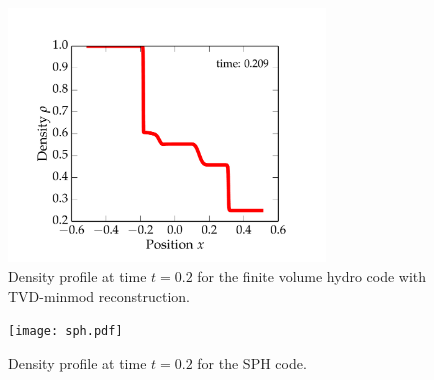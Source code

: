 \documentclass{article}
\begin{document}
\begin{spacing}{1.1}
\begin{figure}[H]
 \centering
 \hspace{0cm} \includegraphics[width=0.75\textwidth]{minmod.pdf}
 \caption{Density profile at time \(t = 0.2\) for the finite volume hydro code with TVD-minmod reconstruction.}
\end{figure}

\begin{figure}[H]
 \centering
 \hspace{0cm} \texttt{[image: sph.pdf]}
 \caption{Density profile at time \(t = 0.2\) for the SPH code.}
\end{figure}



\end{spacing}
\end{document}
